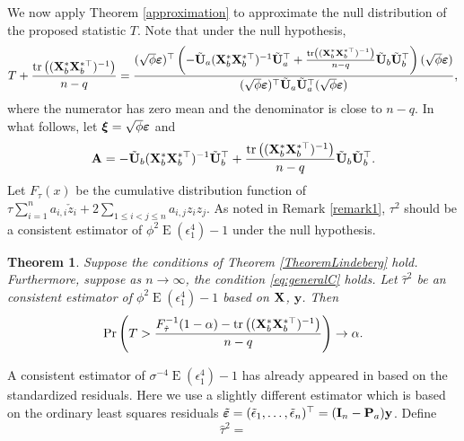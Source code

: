\documentclass[11pt]{article}
\DeclareMathOperator{\mytr}{tr}
\DeclareMathOperator{\myE}{E}
\newcommand{\By}{\mathbf{y}}    \newcommand{\Bz}{\mathbf{z}}
\newcommand{\BA}{\mathbf{A}}    \newcommand{\BB}{\mathbf{B}}    \newcommand{\BC}{\mathbf{C}}    \newcommand{\BD}{\mathbf{D}}    \newcommand{\BE}{\mathbf{E}}    \newcommand{\BF}{\mathbf{F}}    \newcommand{\BG}{\mathbf{G}}    \newcommand{\BH}{\mathbf{H}}    \newcommand{\BI}{\mathbf{I}}    \newcommand{\BJ}{\mathbf{J}}    \newcommand{\BK}{\mathbf{K}}    \newcommand{\BL}{\mathbf{L}}
\newcommand{\bfsym}[1]{\ensuremath{\boldsymbol{#1}}}
\def\bxi{\bfsym {\xi}}
\theoremstyle{plain}
\newtheorem{theorem}{\quad\quad Theorem}
\theoremstyle{definition}
\theoremstyle{remark}
\begin{document}
We now apply Theorem \ref{approximation} to approximate the null distribution of the proposed statistic $T$.
Note that under the null hypothesis,
\begin{equation*}
    T+\frac{\mytr\left( (\BX_b^* \BX_{b}^{*\top})^{-1} \right)}{n-q} 
    =\frac{ (\sqrt \phi \bepsilon)^\top 
        \left( 
    -\tilde \BU_a (\BX_b^* \BX_b^{*\top})^{-1} \tilde \BU_a^\top
 + \frac{\mytr\left( (\BX_b^* \BX_b^{*\top})^{-1} \right)}{n-q}\tilde{\BU}_b \tilde{\BU}_b^\top
        \right)
    (\sqrt \phi \bepsilon)}{ (\sqrt \phi \bepsilon)^\top \tilde \BU_a  \tilde \BU_a^\top (\sqrt \phi \bepsilon)},
\end{equation*}
where the numerator has zero mean and the denominator is close to $n-q$.
In what follows, let $\bxi=\sqrt \phi \bepsilon$ and 
    \begin{equation*}
        \BA= -\tilde{\BU}_b (\BX_{b}^* \BX_b^{*\top})^{-1} \tilde{\BU}_b^\top 
        + \frac{\mytr\left( (\BX_b^* \BX_b^{*\top})^{-1} \right)}{n-q}\tilde{\BU}_b \tilde{\BU}_b^\top.
    \end{equation*}
    Let $F_{\tau} (x)$ be the cumulative distribution function of $
            \tau \sum_{i=1}^n  a_{i,i}\check z_i
        +2\sum_{1\leq i <j \leq n} a_{i,j} z_i z_j
        $.
        As noted in Remark \ref{remark1}, $\tau^2$ should be a consistent estimator of $\phi^2 \myE (\epsilon_1^4)-1$ under the null hypothesis.

\begin{theorem}
    Suppose the conditions of Theorem \ref{TheoremLindeberg} hold. Furthermore, suppose as $n\to \infty$, the condition \eqref{eq:generalC} holds.
        Let $\hat \tau^2$ be an consistent estimator of $\phi^2 \myE (\epsilon_1^4)-1$ based on $\mathbf{X}$, $\By$.
    Then
    \begin{equation*}
            \Pr\left( T > \frac{F^{-1}_{\hat \tau} (1-\alpha)-\mytr\left( (\BX_b^* \BX_b^{*\top})^{-1}  \right)}{n-q} \right)
            \to \alpha.
    \end{equation*}
    \label{thm:criticalValue}
\end{theorem}

        A consistent estimator of $\sigma^{-4} \myE (\epsilon_1^4)-1$ has already appeared in \cite{Bai2017} based on the standardized residuals.
        Here we use a slightly different estimator which is based on the ordinary least squares residuals $\tilde \bepsilon=(\tilde \epsilon_1,\ldots, \tilde \epsilon_n)^\top=(\BI_n - \BP_a) \By$.
        Define
\begin{equation*}
    \hat \tau^2 =     
\end{equation*}
\end{document}
